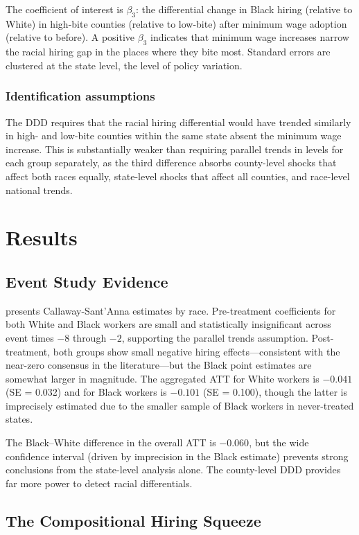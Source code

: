 \documentclass[12pt]{article}
\begin{document}
The coefficient of interest is $\beta_3$: the differential change in Black hiring (relative to White) in high-bite counties (relative to low-bite) after minimum wage adoption (relative to before). A positive $\beta_3$ indicates that minimum wage increases narrow the racial hiring gap in the places where they bite most. Standard errors are clustered at the state level, the level of policy variation.

\subsubsection*{Identification assumptions} The DDD requires that the racial hiring differential would have trended similarly in high- and low-bite counties within the same state absent the minimum wage increase. This is substantially weaker than requiring parallel trends in levels for each group separately, as the third difference absorbs county-level shocks that affect both races equally, state-level shocks that affect all counties, and race-level national trends.


\section{Results}

\subsection{Event Study Evidence}

 presents Callaway-Sant'Anna estimates by race. Pre-treatment coefficients for both White and Black workers are small and statistically insignificant across event times $-8$ through $-2$, supporting the parallel trends assumption. Post-treatment, both groups show small negative hiring effects---consistent with the near-zero consensus in the literature---but the Black point estimates are somewhat larger in magnitude. The aggregated ATT for White workers is $-0.041$ (SE = 0.032) and for Black workers is $-0.101$ (SE = 0.100), though the latter is imprecisely estimated due to the smaller sample of Black workers in never-treated states.

The Black--White difference in the overall ATT is $-0.060$, but the wide confidence interval (driven by imprecision in the Black estimate) prevents strong conclusions from the state-level analysis alone. The county-level DDD provides far more power to detect racial differentials.

\subsection{The Compositional Hiring Squeeze}
\end{document}
